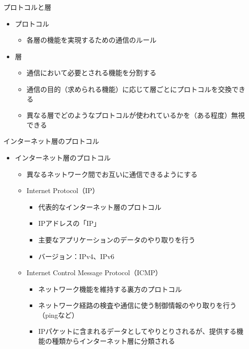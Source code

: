 \documentclass[12pt,aspectratio=169]{beamer}
\begin{document}
\begin{frame}{プロトコルと層}

  \begin{itemize}
    \item プロトコル
      \begin{itemize}
        \item 各層の機能を実現するための通信のルール

      \end{itemize}

    \item 層
      \begin{itemize}
        \item 通信において必要とされる機能を分割する
        \item 通信の目的（求められる機能）に応じて層ごとにプロトコルを交換できる
        \item 異なる層でどのようなプロトコルが使われているかを（ある程度）無視できる

      \end{itemize}


  \end{itemize}

\end{frame}


\begin{frame}{インターネット層のプロトコル}

  \begin{itemize}
    \item インターネット層のプロトコル
      \begin{itemize}
        \item 異なるネットワーク間でお互いに通信できるようにする
        \item Internet Protocol（IP）
          \begin{itemize}
            \item 代表的なインターネット層のプロトコル
            \item IPアドレスの「IP」
            \item 主要なアプリケーションのデータのやり取りを行う
            \item バージョン：IPv4、IPv6
          \end{itemize}

        \item Internet Control Message Protocol（ICMP）
          \begin{itemize}
            \item ネットワーク機能を維持する裏方のプロトコル
            \item ネットワーク経路の検査や通信に使う制御情報のやり取りを行う（pingなど）
            \item IPパケットに含まれるデータとしてやりとりされるが、提供する機能の種類からインターネット層に分類される
          \end{itemize}

      \end{itemize}
  \end{itemize}

\end{frame}
\end{document}
